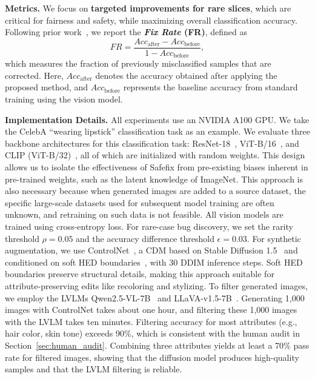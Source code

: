 \documentclass[10pt]{article} %
\newcommand{\controlnet}{ControlNet\xspace}
\newcommand{\qwen}{Qwen2.5-VL\xspace}
\newcommand{\llava}{LLaVA-v1.5\xspace}
\begin{document}
\noindent\textbf{Metrics.} We focus on \textbf{targeted improvements for rare slices}, which are critical for fairness and safety, while maximizing overall classification accuracy. Following prior work~\citep{lai2023improvingpredictionbackwardcompatiblilitynlp}, we report the \textbf{\emph{Fix Rate} (FR)}, defined as
\vspace{-5pt}
\begin{equation}
FR = \frac{Acc_{\text{after}} - Acc_{\text{before}}}{1 - Acc_{\text{before}}},
\end{equation}
which measures the fraction of previously misclassified samples that are corrected. Here, $Acc_{\text{after}}$ denotes the accuracy obtained after applying the proposed method, and $Acc_{\text{before}}$ represents the baseline accuracy from standard training using the vision model.

\noindent \textbf{Implementation Details.} All experiments use an NVIDIA A100 GPU.  
We take the CelebA ``wearing lipstick'' classification task as an example.  
We evaluate three backbone architectures for this classification task: ResNet-18~\citep{he2016deep}, ViT-B/16~\citep{dosovitskiy2020vit}, and CLIP (ViT-B/32)~\citep{radford2021learning}, all of which are initialized with random weights. This design allows us to isolate the effectiveness of Safefix from pre-existing biases inherent in pre-trained weights, such as the latent knowledge of ImageNet. This approach is also necessary because when generated images are added to a source dataset, the specific large-scale datasets used for subsequent model training are often unknown, and retraining on such data is not feasible. All vision models are trained using cross-entropy loss. For rare-case bug discovery, we set the rarity threshold \(\rho = 0.05\) and the accuracy difference threshold \(\epsilon = 0.03\). For synthetic augmentation, we use \controlnet~\citep{zhang2023adding}, a CDM based on Stable Diffusion 1.5~\citep{rombach2022high} and conditioned on soft HED boundaries~\citep{xie2015holistically}, with 30 DDIM inference steps. Soft HED boundaries preserve structural details, making this approach suitable for attribute-preserving edits like recoloring and stylizing.
To filter generated images, we employ the LVLMs \qwen{}-7B~\citep{bai2025qwen25vl} and \llava{}-7B~\citep{liu2023improvedllava}. Generating 1,000 images with ControlNet takes about one hour, and filtering these 1,000 images with the LVLM takes ten minutes. Filtering accuracy for most attributes (e.g., hair color, skin tone) exceeds 90\%, which is consistent with the human audit in Section~\ref{sec:human_audit}. Combining three attributes yields at least a 70\% pass rate for filtered images, showing that the diffusion model produces high-quality samples and that the LVLM filtering is reliable.
\end{document}
